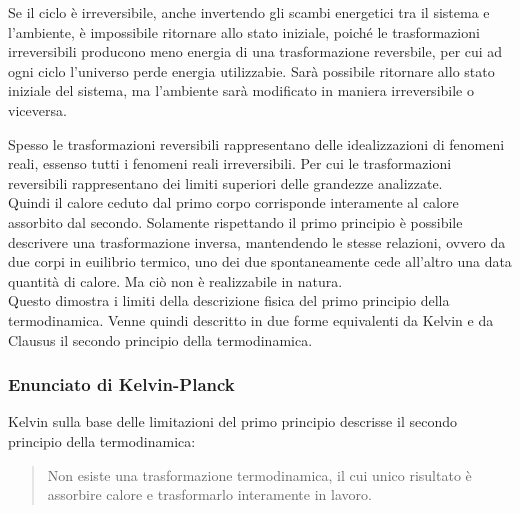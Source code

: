 \documentclass{article}
\numberwithin{equation}{subsection}
\begin{document}
Se il ciclo è irreversibile, anche invertendo gli scambi energetici tra il sistema e l'ambiente, è impossibile ritornare allo stato iniziale, poiché le trasformazioni 
irreversibili producono meno energia di una trasformazione reversbile, per cui ad ogni ciclo l'universo perde energia utilizzabie. Sarà possibile ritornare allo stato iniziale 
del sistema, ma l'ambiente sarà modificato in maniera irreversibile o viceversa. 


Spesso le trasformazioni reversibili rappresentano delle idealizzazioni di fenomeni reali, essenso tutti i fenomeni reali irreversibili. Per cui le trasformazioni reversibili 
rappresentano dei limiti superiori delle grandezze analizzate. 
\\
Quindi 
il calore ceduto dal primo corpo corrisponde interamente al 
calore assorbito dal secondo. Solamente rispettando il primo 
principio è possibile descrivere una trasformazione 
inversa, mantendendo le stesse relazioni, ovvero da due 
corpi in euilibrio termico, uno dei due spontaneamente cede 
all'altro una data quantità di calore. Ma ciò non è 
realizzabile in natura.
\\
Questo dimostra i limiti della descrizione fisica del 
primo principio della termodinamica. Venne quindi 
descritto in due forme equivalenti da Kelvin e da Clausus 
il secondo principio della termodinamica. 

\subsubsection{Enunciato di Kelvin-Planck}

Kelvin sulla base delle limitazioni del primo principio descrisse il secondo principio della termodinamica: 
\begin{quotation}
    Non esiste una trasformazione termodinamica, il cui unico 
    risultato è assorbire calore e trasformarlo interamente in 
    lavoro. 
\end{quotation}

\begin{center}\end{center}
\end{document}
